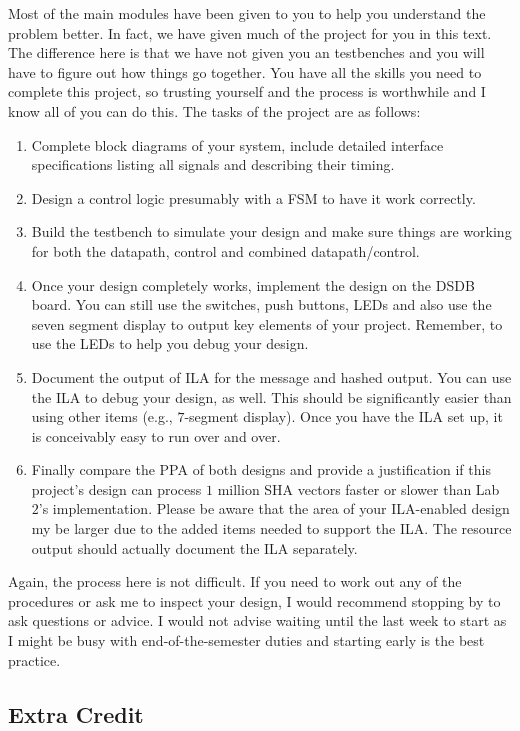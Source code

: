 \documentclass{article}
\begin{document}
Most of the main modules have been given to you to help you understand the
problem better.   In fact, we have given much of the project for you
in this text.  The difference here is that we have not given you an
testbenches and you will have to figure out how things go together.
You have all the skills you need to complete this project, so trusting
yourself and the process is worthwhile and I know all of you can do
this.  The tasks of the project are as follows:
\begin{enumerate}
  \item Complete block diagrams of your system, include detailed
    interface specifications listing all signals and describing their
    timing.
  \item Design a control logic presumably with a FSM to have it work
  correctly.
\item  Build the testbench to simulate your design and make sure
  things are working for both the datapath, control and combined
  datapath/control.    
  \item Once your design completely works, implement the design on
    the DSDB board.  You can still use the switches, push
    buttons, LEDs and also use the
    seven segment display to output key elements of your project.
    Remember, to use the LEDs to help you debug your design.
  \item Document the output of ILA for the message and hashed output.
    You can use the ILA to debug your design, as well.  This should be
    significantly easier than using other items (e.g., $7$-segment
    display).  Once you have the ILA set up, it is conceivably easy to
    run over and over.
  \item Finally compare the PPA of both designs and provide a
    justification if this project's design can process $1$ million SHA
    vectors faster or slower than Lab~$2$'s implementation.  Please be
    aware that the area of your ILA-enabled design my be larger due to
    the added items needed to support the ILA.  The resource output
    should actually document the ILA separately.  
\end{enumerate}

Again, the process here is not difficult.  If you need to work out any
of the procedures or ask me to inspect your design, I would recommend
stopping by to ask questions or advice.  I would not advise waiting
until the last week to start as I might be busy with
end-of-the-semester duties and starting early is the best practice.

\subsection{Extra Credit}
\end{document}
